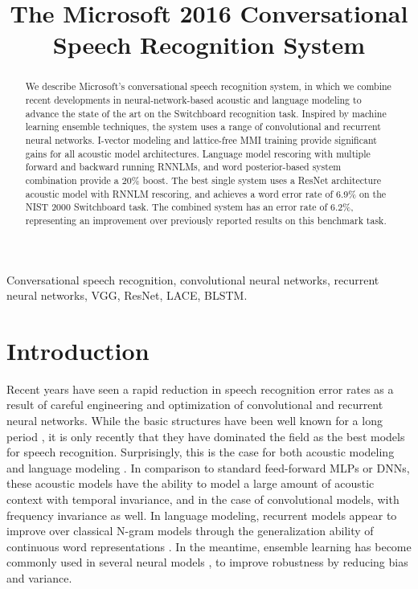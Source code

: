 \documentclass{article}
\title{The Microsoft 2016 Conversational Speech Recognition System}
\begin{document}
\ninept

\maketitle


\begin{abstract}
We describe 
Microsoft's conversational speech recognition system,
in which we combine recent developments in neural-network-based acoustic and language modeling
to advance the state of the art on the Switchboard recognition task.
Inspired by machine learning ensemble techniques, the system uses
a range of convolutional and recurrent neural networks.
I-vector modeling and lattice-free MMI training provide significant
gains for all acoustic model architectures.
Language model rescoring with multiple forward and backward running RNNLMs,
and word posterior-based system combination provide a 20\% boost.
The best single system uses a ResNet architecture acoustic 
model with RNNLM rescoring,
and achieves a word error rate of 6.9\% on the NIST 2000 Switchboard task.
The combined system has an error rate of 6.2\%,
representing an improvement over previously reported results on this benchmark task. 
\end{abstract}

\begin{keywords}
Conversational speech recognition, convolutional neural networks, recurrent neural networks, VGG, ResNet, LACE, BLSTM.
\end{keywords}

\section{Introduction}
\label{sec:intro}

Recent years have seen a rapid reduction in speech recognition error rates
as a result of careful engineering and optimization
of convolutional and recurrent neural networks. While the 
basic structures have been well known
for a long period \cite{pineda1987generalization,williams1989learning,waibel1989phoneme,lecun1995convolutional,lecun1989backpropagation,robinson1991recurrent,hochreiter1997long},
it is only recently that they have dominated the field as the best models for 
speech recognition. Surprisingly, this is the case for both acoustic
modeling \cite{sak2014long,sak2015fast,saon2015ibm,sercu2016very,bi2015very,qian2016very} 
and language modeling \cite{mikolov2010recurrent,mikolov2012context}. 
In comparison to standard feed-forward MLPs or DNNs, these acoustic models
have the ability to model a large amount of acoustic context with temporal
invariance, and in the case of convolutional models, with frequency invariance
as well.
In language modeling, recurrent models appear to improve over classical N-gram models
through the generalization ability of continuous word representations \cite{mikolov2013linguistic}.
In the meantime, ensemble learning has 
become commonly used in several neural models \cite{sutskever2014sequence,hannun2014deep,mikolov2012context},
to improve robustness by reducing bias and variance. 
\end{document}
